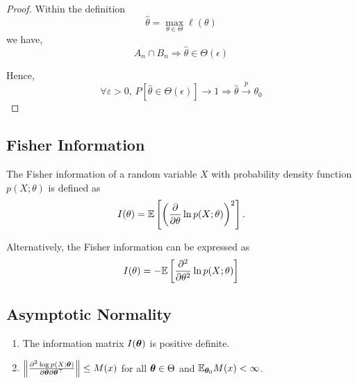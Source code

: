 \begin{proof}
	Within the definition
	\begin{equation*}
		\hat{\theta}=\max_{\theta\in\Theta}\hat{\ell}\left(\theta\right)
	\end{equation*}
	we have,
	\begin{equation*}
		A_{n}\cap B_{n}\Longrightarrow\hat{\theta}\in\Theta(\epsilon)
	\end{equation*}

	Hence,
	\begin{equation*}
		\forall\varepsilon>0,\,P\left[\hat{\theta}\in\Theta(\epsilon)\right]\rightarrow 1\Longrightarrow\hat{\theta}\stackrel{p}{\rightarrow}\theta_{0}
	\end{equation*}
\end{proof}

\subsection{Fisher Information}

\begin{definition}
	The Fisher information of a random variable $X$ with probability density function $p(X;\theta)$ is defined as
	\begin{equation}
		I(\theta)={\mathbb E}\left[\left(\frac{\partial}{\partial\theta}\ln p(X;\theta)\right)^{2}\right].
	\end{equation}
\end{definition}

Alternatively, the Fisher information can be expressed as
\begin{equation}
	I(\theta)=-{\mathbb E}\left[\frac{\partial^{2}}{\partial\theta^{2}}\ln p(X;\theta)\right]
\end{equation}

\subsection{Asymptotic Normality}

\begin{enumerate}[label=(C\arabic*),resume]
	\item The information matrix $I(\boldsymbol{\theta})$ is positive definite.
	\item $\left\|\frac{\partial^{2}\log p(X;\boldsymbol{\theta})}{\partial\boldsymbol{\theta}\partial\boldsymbol{\theta}^{\top}}\right\|\leq M(x)$ for all $\boldsymbol{\theta}\in\Theta$ and ${\mathbb E}_{\boldsymbol{\theta}_{0}}M(x)<\infty$.
\end{enumerate}

